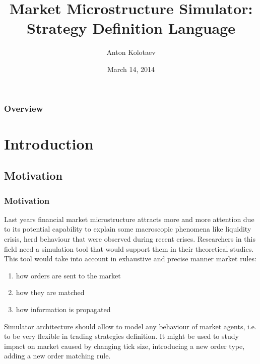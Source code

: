 \documentclass{beamer}
\title[FiQuant Market Simulator]{Market Microstructure Simulator: Strategy Definition Language} %
\author{Anton Kolotaev} %
\institute[ECP] %
{
Chair of Quantitative Finance, \'{E}cole Centrale Paris \\ %
\medskip
\textit{anton.kolotaev@gmail.com} %

PREMIA consortium annual meeting
}
\date{March 14, 2014} %
\begin{document}
\begin{frame}
\titlepage %
\end{frame}

\begin{frame}
\frametitle{Overview} %
\tableofcontents %
\end{frame}


\section{Introduction}
\subsection{Motivation}
\begin{frame}
\frametitle{Motivation}
Last years financial market microstructure attracts more and more attention due to its potential capability to explain some macroscopic phenomena like liquidity crisis, herd behaviour that were observed during recent crises. Researchers in this field need a simulation tool that would support them in their theoretical studies. This tool would take into account in exhaustive and precise manner market rules:
\begin{enumerate}
\item how orders are sent to the market
\item how they are matched
\item how information is propagated 
\end{enumerate}
Simulator architecture should allow to model any behaviour of market agents, i.e. to be very flexible in trading strategies definition. It might be used to study impact on market caused by changing tick size, introducing a new order type, adding a new order matching rule.
\end{frame}
\end{document}
